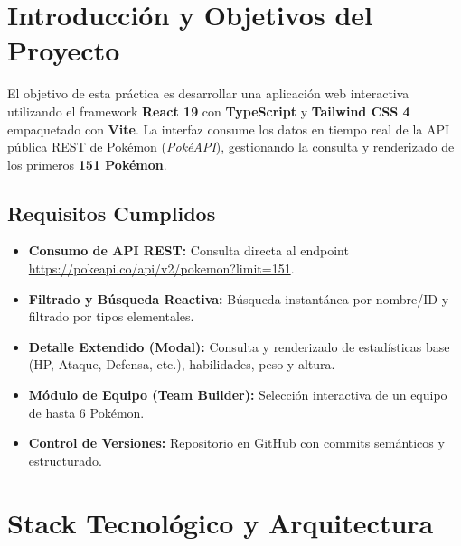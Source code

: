 \documentclass[12pt,a4paper]{article}
\begin{document}

\section{Introducción y Objetivos del Proyecto}

El objetivo de esta práctica es desarrollar una aplicación web interactiva utilizando el framework \textbf{React 19} con \textbf{TypeScript} y \textbf{Tailwind CSS 4} empaquetado con \textbf{Vite}. La interfaz consume los datos en tiempo real de la API pública REST de Pokémon (\textit{PokéAPI}), gestionando la consulta y renderizado de los primeros \textbf{151 Pokémon}.

\subsection*{Requisitos Cumplidos}
\begin{itemize}[leftmargin=*]
    \item \textbf{Consumo de API REST:} Consulta directa al endpoint \url{https://pokeapi.co/api/v2/pokemon?limit=151}.
    \item \textbf{Filtrado y Búsqueda Reactiva:} Búsqueda instantánea por nombre/ID y filtrado por tipos elementales.
    \item \textbf{Detalle Extendido (Modal):} Consulta y renderizado de estadísticas base (HP, Ataque, Defensa, etc.), habilidades, peso y altura.
    \item \textbf{Módulo de Equipo (Team Builder):} Selección interactiva de un equipo de hasta 6 Pokémon.
    \item \textbf{Control de Versiones:} Repositorio en GitHub con commits semánticos y estructurado.
\end{itemize}

\section{Stack Tecnológico y Arquitectura}
\end{document}
